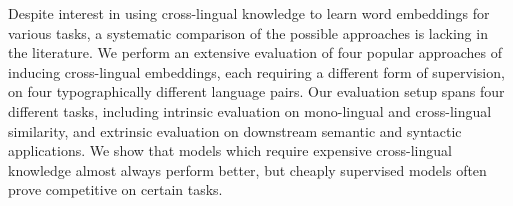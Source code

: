 Despite interest in using cross-lingual knowledge to learn word embeddings for various tasks, a systematic comparison of the possible approaches is lacking in the literature. We perform an extensive evaluation of four popular approaches of inducing cross-lingual embeddings, each requiring a different form of supervision, on four typographically different language pairs. Our evaluation setup spans four different tasks, including intrinsic evaluation on mono-lingual and cross-lingual similarity, and extrinsic evaluation on downstream semantic and syntactic applications. We show that models which require expensive cross-lingual knowledge almost always perform better, but cheaply supervised models often prove competitive on certain tasks.
